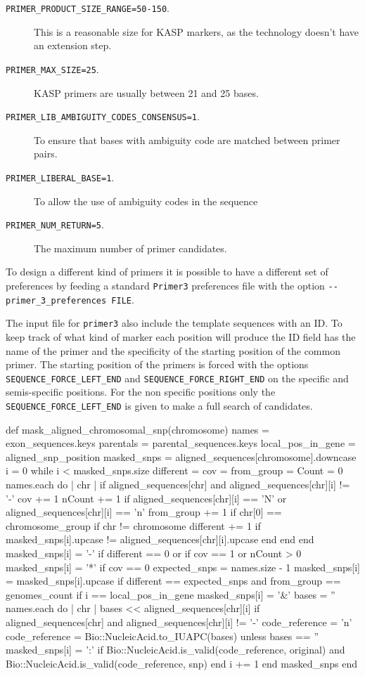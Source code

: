\begin{description}
\item[\texttt{PRIMER\_PRODUCT\_SIZE\_RANGE=50-150}.] This is a reasonable size for KASP markers, as the technology doesn't have an extension step. 
\item[\texttt{PRIMER\_MAX\_SIZE=25}.] KASP primers are usually between 21 and 25 bases.
\item[\texttt{PRIMER\_LIB\_AMBIGUITY\_CODES\_CONSENSUS=1}.] To ensure that bases with ambiguity code are matched between primer pairs. 
\item[\texttt{PRIMER\_LIBERAL\_BASE=1}.] To allow the use of ambiguity codes in the sequence
\item[\texttt{PRIMER\_NUM\_RETURN=5}.] The maximum number of primer candidates. 
\end{description}
To design a different kind of primers it is possible to have a different set of preferences by feeding a standard \texttt{Primer3} preferences file with the option \verb|--primer_3_preferences FILE|. 

The input file for \verb|primer3| also include the template sequences with an ID. 
To keep track of what kind of marker each position will produce the ID field has the name of the primer and the specificity of the starting position of the common primer. 
The starting position of the primers is forced with the options \verb|SEQUENCE_FORCE_LEFT_END| and \verb|SEQUENCE_FORCE_RIGHT_END| on the specific and semis-specific positions. 
For the non specific positions only the \verb|SEQUENCE_FORCE_LEFT_END| is given to make a full search of candidates. 

\begin{code}[language=Ruby,caption=Method that calculates the mask of the alignment, label=lst:poly:mask]
def mask_aligned_chromosomal_snp(chromosome)
  names = exon_sequences.keys
  parentals =  parental_sequences.keys
  local_pos_in_gene = aligned_snp_position
  masked_snps = aligned_sequences[chromosome].downcase
  i = 0
  while i < masked_snps.size
    different = cov = from_group = Count = 0
    names.each do | chr |
      if aligned_sequences[chr] and aligned_sequences[chr][i]  != '-'
        cov += 1 
        nCount += 1 if aligned_sequences[chr][i] == 'N' or  aligned_sequences[chr][i] == 'n' 
        from_group += 1 if chr[0] == chromosome_group
        if chr != chromosome 
          different += 1  if masked_snps[i].upcase != aligned_sequences[chr][i].upcase 
        end
      end
    end
    masked_snps[i] = '-' if different == 0 or if cov == 1 or nCount > 0
    masked_snps[i] = '*' if cov == 0
    expected_snps = names.size - 1 
    masked_snps[i] = masked_snps[i].upcase if different == expected_snps and from_group == genomes_count
    if i == local_pos_in_gene
      masked_snps[i] = '&'
      bases = ''
      names.each do | chr | { bases << aligned_sequences[chr][i]  if aligned_sequences[chr] and aligned_sequences[chr][i]  != '-' }
      code_reference = 'n'
      code_reference = Bio::NucleicAcid.to_IUAPC(bases) unless bases == ''
      masked_snps[i] = ':' if Bio::NucleicAcid.is_valid(code_reference,   original) and Bio::NucleicAcid.is_valid(code_reference,   snp)
    end
  i += 1
  end
  masked_snps
end
\end{code}

